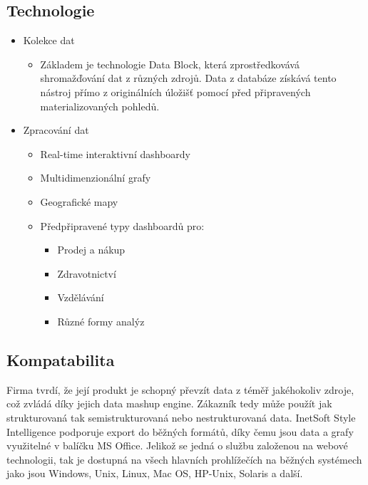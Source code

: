 \documentclass[czech,BP]{thesiskiv}
\begin{document}
\subsection{Technologie}
\begin{itemize}
	\item Kolekce dat
	\begin{itemize}
		\item Základem je technologie Data Block\texttrademark, která zprostředkovává shromažďování dat z různých zdrojů. Data z databáze získává tento nástroj přímo z originálních úložišť pomocí před připravených materializovaných pohledů.
	\end{itemize}
	\item Zpracování dat
	\begin{itemize}
		\item Real-time interaktivní dashboardy
		\item Multidimenzionální grafy
		\item Geografické mapy
		\item Předpřipravené typy dashboardů pro:
		\begin{itemize}
			\item Prodej a nákup
			\item Zdravotnictví
			\item Vzdělávání
			\item Různé formy analýz
		\end{itemize}
	\end{itemize}
\end{itemize}

\subsection{Kompatabilita}
Firma tvrdí, že její produkt je schopný převzít data z téměř jakéhokoliv zdroje, což zvládá díky jejich data mashup engine. Zákazník tedy může použít jak strukturovaná tak semistrukturovaná nebo nestrukturovaná data. InetSoft Style Intelligence podporuje export do běžných formátů, díky čemu jsou data a grafy využitelné v balíčku MS Office. Jelikož se jedná o službu založenou na webové technologii, tak je dostupná na všech hlavních prohlížečích na běžných systémech jako jsou Windows, Unix, Linux, Mac OS, HP-Unix, Solaris a další.\cite{InetKompatilbilita}
\end{document}
